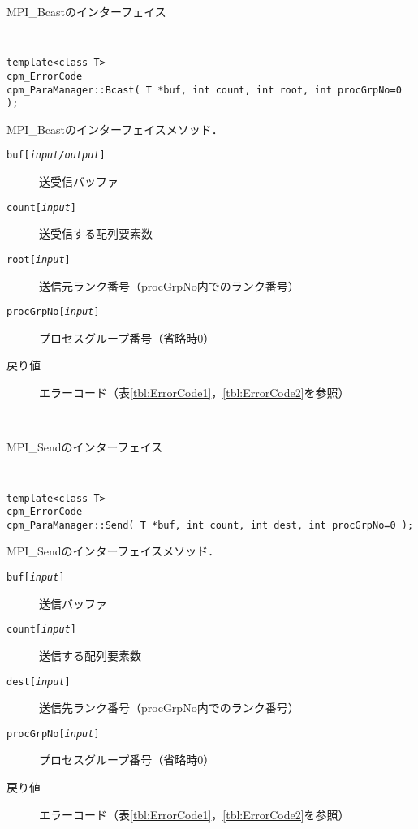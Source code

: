 \begin{spacing}{0.8}
\begin{itembox}[l]{MPI\_Bcastのインターフェイス}
{\tt
\begin{verbatim}
template<class T>
cpm_ErrorCode
cpm_ParaManager::Bcast( T *buf, int count, int root, int procGrpNo=0 );
\end{verbatim}
}
MPI\_Bcastのインターフェイスメソッド．
\begin{description}
\item[{\tt buf[{\it input/output}]}] 送受信バッファ
\item[{\tt count[{\it input}]}] 送受信する配列要素数
\item[{\tt root[{\it input}]}] 送信元ランク番号（procGrpNo内でのランク番号）
\item[{\tt procGrpNo[{\it input}]}] プロセスグループ番号（省略時0）
\\
\item[戻り値] エラーコード（表\ref{tbl:ErrorCode1}，\ref{tbl:ErrorCode2}を参照）
\end{description}
\end{itembox}\\
\end{spacing}

\begin{spacing}{0.8}
\begin{itembox}[l]{MPI\_Sendのインターフェイス}
{\tt
\begin{verbatim}
template<class T>
cpm_ErrorCode
cpm_ParaManager::Send( T *buf, int count, int dest, int procGrpNo=0 );
\end{verbatim}
}
MPI\_Sendのインターフェイスメソッド．
\begin{description}
\item[{\tt buf[{\it input}]}] 送信バッファ
\item[{\tt count[{\it input}]}] 送信する配列要素数
\item[{\tt dest[{\it input}]}] 送信先ランク番号（procGrpNo内でのランク番号）
\item[{\tt procGrpNo[{\it input}]}] プロセスグループ番号（省略時0）
\\
\item[戻り値] エラーコード（表\ref{tbl:ErrorCode1}，\ref{tbl:ErrorCode2}を参照）
\end{description}
\end{itembox}\\
\end{spacing}

